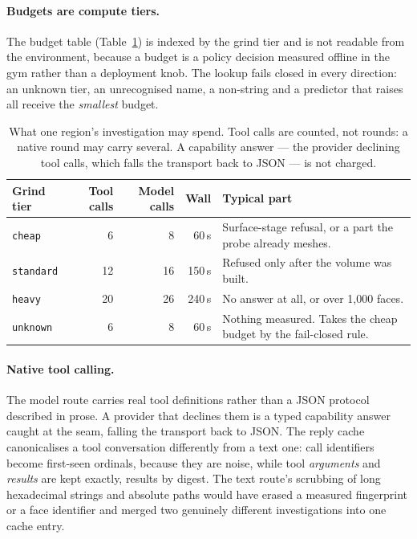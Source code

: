 \documentclass[11pt,onecolumn]{article}
\newcommand{\code}[1]{\texttt{\small #1}}
\begin{document}
\paragraph{Budgets are compute tiers.}
The budget table (Table~\ref{tab:budget}) is indexed by the grind
tier and is not readable from the environment, because a budget is a policy decision measured
offline in the gym rather than a deployment knob. The lookup fails closed in every direction: an
unknown tier, an unrecognised name, a non-string and a predictor that raises all receive the
\emph{smallest} budget.

\begin{table}[h]
\centering
\caption{What one region's investigation may spend. Tool calls are counted, not rounds: a native
round may carry several. A capability answer --- the provider declining tool calls, which falls the
transport back to JSON --- is not charged.}
\label{tab:budget}
\footnotesize
\begin{tabularx}{\textwidth}{@{}l r r r X@{}}
\toprule
\textbf{Grind tier} & \textbf{Tool calls} & \textbf{Model calls} & \textbf{Wall} & \textbf{Typical part}\\
\midrule
\code{cheap}    &  6 &  8 &  60\,s & Surface-stage refusal, or a part the probe already meshes.\\
\code{standard} & 12 & 16 & 150\,s & Refused only after the volume was built.\\
\code{heavy}    & 20 & 26 & 240\,s & No answer at all, or over 1{,}000 faces.\\
\code{unknown}  &  6 &  8 &  60\,s & Nothing measured. Takes the cheap budget by the fail-closed rule.\\
\bottomrule
\end{tabularx}
\end{table}

\paragraph{Native tool calling.}
The model route carries real tool definitions rather than a JSON
protocol described in prose. A provider that declines them is a typed capability answer caught at
the seam, falling the transport back to JSON. The reply cache canonicalises a tool conversation
differently from a text one: call identifiers become first-seen ordinals, because they are noise,
while tool \emph{arguments} and \emph{results} are kept exactly, results by digest. The text
route's scrubbing of long hexadecimal strings and absolute paths would have erased a measured
fingerprint or a face identifier and merged two genuinely different investigations into one cache
entry.
\end{document}
